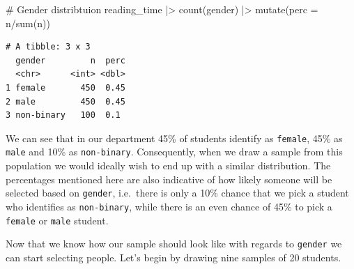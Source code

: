 \documentclass[
  letterpaper,
]{krantz}
\makeatletter
\newenvironment{Shaded}{\begin{snugshade}}{\end{snugshade}}
\newcommand{\AttributeTok}[1]{\textcolor[rgb]{0.40,0.45,0.13}{#1}}
\newcommand{\CommentTok}[1]{\textcolor[rgb]{0.37,0.37,0.37}{#1}}
\newcommand{\FunctionTok}[1]{\textcolor[rgb]{0.28,0.35,0.67}{#1}}
\newcommand{\NormalTok}[1]{\textcolor[rgb]{0.00,0.23,0.31}{#1}}
\newcommand{\SpecialCharTok}[1]{\textcolor[rgb]{0.37,0.37,0.37}{#1}}
\newenvironment{kframe}{%
\medskip{}
\setlength{\fboxsep}{.8em}
 \def\at@end@of@kframe{}%
 \ifinner\ifhmode%
  \def\at@end@of@kframe{\end{minipage}}%
  \begin{minipage}{\columnwidth}%
 \fi\fi%
 \def\FrameCommand##1{\hskip\@totalleftmargin \hskip-\fboxsep
 \colorbox{shadecolor}{##1}\hskip-\fboxsep
     \hskip-\linewidth \hskip-\@totalleftmargin \hskip\columnwidth}%
 \MakeFramed {\advance\hsize-\width
   \@totalleftmargin\z@ \linewidth\hsize
   \@setminipage}}%
 {\par\unskip\endMakeFramed%
 \at@end@of@kframe}
\renewenvironment{Shaded}{\begin{kframe}}{\end{kframe}}
\makeatother
\begin{document}
\begin{Shaded}
\begin{Highlighting}[]
\CommentTok{\# Gender distribtuion}
\NormalTok{reading\_time }\SpecialCharTok{|\textgreater{}}
  \FunctionTok{count}\NormalTok{(gender) }\SpecialCharTok{|\textgreater{}}
  \FunctionTok{mutate}\NormalTok{(}\AttributeTok{perc =}\NormalTok{ n}\SpecialCharTok{/}\FunctionTok{sum}\NormalTok{(n))}
\end{Highlighting}
\end{Shaded}

\begin{verbatim}
# A tibble: 3 x 3
  gender         n  perc
  <chr>      <int> <dbl>
1 female       450  0.45
2 male         450  0.45
3 non-binary   100  0.1 
\end{verbatim}

We can see that in our department 45\% of students identify as
\texttt{female}, 45\% as \texttt{male} and 10\% as \texttt{non-binary}.
Consequently, when we draw a sample from this population we would
ideally wish to end up with a similar distribution. The percentages
mentioned here are also indicative of how likely someone will be
selected based on \texttt{gender}, i.e.~there is only a 10\% chance that
we pick a student who identifies as \texttt{non-binary}, while there is
an even chance of 45\% to pick a \texttt{female} or \texttt{male}
student.

Now that we know how our sample should look like with regards to
\texttt{gender} we can start selecting people. Let's begin by drawing
nine samples of 20 students.
\end{document}
